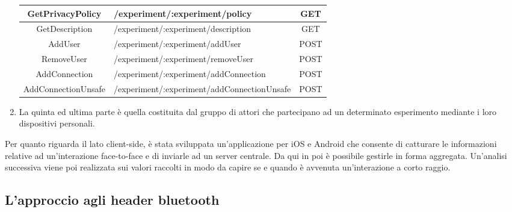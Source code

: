 \documentclass[12pt,twoside]{report}
\begin{document}
\begin{enumerate}
\begin{table}[h]
\begin{tabular}{|c|l|c|}
    GetPrivacyPolicy    & /experiment/:experiment/policy              & GET     \\ \hline
    GetDescription      & /experiment/:experiment/description         & GET     \\ \hline
    AddUser             & /experiment/:experiment/addUser             & POST    \\ \hline
    RemoveUser          & /experiment/:experiment/removeUser          & POST    \\ \hline
    AddConnection       & /experiment/:experiment/addConnection       & POST    \\ \hline
    AddConnectionUnsafe & /experiment/:experiment/addConnectionUnsafe & POST    \\ \hline
    \end{tabular}
\end{table}
	\FloatBarrier


	\item La quinta ed ultima parte è quella costituita dal gruppo di attori che partecipano ad un determinato esperimento mediante i loro dispositivi personali.
	
	
	\end{enumerate}
	
	
	Per quanto riguarda il lato client-side, è stata sviluppata un'applicazione per iOS e Android che consente di catturare le informazioni relative ad un'interazione face-to-face e di inviarle ad un server centrale. Da qui in poi è possibile gestirle in forma aggregata. Un'analisi successiva viene poi realizzata sui valori raccolti in modo da capire se e quando è avvenuta un'interazione a corto raggio.
	
	
	
	\subsection{L'approccio agli header bluetooth}
	
\end{document}
